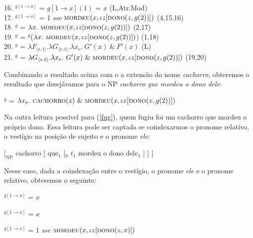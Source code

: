\begin{exe}
	16. $^{g[1 \rightarrow x]}$ = $g[1 \rightarrow x](1)$ = $x$ \hfill (L,Atr.Mod)\\
	17. $^{g[1 \rightarrow x]}$ = 1 \textit{sse} $\textsc{mordeu}(x,\iota z[\textsc{dono}(z,g(2))])$ \hfill (4,15,16)\\
	18. $^{g}$ = $\lambda x.\ \textsc{mordeu}(x,\iota z[\textsc{dono}(z,g(2))])$ \hfill (2,17)\\
	19. $^{g}$ = $^{g}$($\lambda x.\ \textsc{mordeu}(x,\iota z[\textsc{dono}(z,g(2))])$) \hfill (1,18)\\
	20. $^{g}$ = $\lambda F_{\langle e,t\rangle}.\lambda G_{\langle e,t\rangle}.\lambda x_{e}.\ G'(x)\ \&\ F'(x)$ \hfill (L)\\
	21. $^{g}$ = $\lambda G_{\langle e,t\rangle}.\lambda x_{e}.\ G'(x)\ \&\ \textsc{mordeu}(x,\iota z[\textsc{dono}(z,g(2))])$ \hfill (19,20)
\end{exe}

\n Combinando o resultado acima com o a extensão do nome
\textit{cachorro}, obteremos o resultado que desejávamos
para o NP \textit{cachorro que mordeu o dono dele}:

\begin{exe}
	\ex {}$^{g}$ = $\lambda x_{e}.\ \predica{cachorro}{x}\ \&\ \textsc{mordeu}(x,\iota x[\textsc{dono}(x,g(2))])$
\end{exe}

\n Na outra leitura possível para (\ref{fug}), quem fugiu foi um
cachorro que mordeu o próprio dono. Essa leitura pode ser
captada se coindexarmos o pronome relativo, o vestígio na
posição de sujeito e o pronome \textit{ele}:

\begin{exe}
    \ex $[_{\text{NP}}$ cachorro [ que$_{1}$ [$_{\text{S}}$ $t_{1}$ mordeu o dono dele$_{1}$ ] ] ]
    \label{coi}
\end{exe}

\n Nesse caso, dada a coindexação entre o vestígio, o pronome
\textit{ele} e o pronome relativo, obteremos o seguinte:

\begin{exe}
	\ex {}$^{g[1 \rightarrow x]}$ = $x$ 
\end{exe}

\begin{exe}
	\ex {}$^{g[1 \rightarrow x]}$ = $x$
\end{exe} 

\begin{exe}
	\ex {}$^{g[1 \rightarrow x]}$ = 1 \textit{sse} $\textsc{mordeu}(x,\iota z[\textsc{dono}(z,x)])$
\end{exe}

